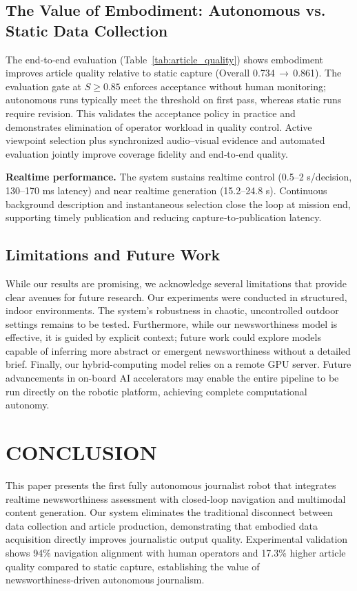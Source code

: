 \documentclass[letterpaper, 10 pt, conference]{ieeeconf}  %
\begin{document}
\subsection{The Value of Embodiment: Autonomous vs. Static Data Collection}

The end‑to‑end evaluation (Table~\ref{tab:article_quality}) shows embodiment improves article quality relative to static capture (Overall 0.734\,$\to$\,0.861). The evaluation gate at $S\!\ge\!0.85$ enforces acceptance without human monitoring; autonomous runs typically meet the threshold on first pass, whereas static runs require revision. This validates the acceptance policy in practice and demonstrates elimination of operator workload in quality control. Active viewpoint selection plus synchronized audio–visual evidence and automated evaluation jointly improve coverage fidelity and end‑to‑end quality.

\textbf{Real\-time performance.} The system sustains real\-time control (0.5–2 s/decision, 130–170 ms latency) and near real\-time generation (15.2–24.8 s). Continuous background description and instantaneous selection close the loop at mission end, supporting timely publication and reducing capture‑to‑publication latency.

\subsection{Limitations and Future Work}

While our results are promising, we acknowledge several limitations that provide clear avenues for future research. Our experiments were conducted in structured, indoor environments. The system's robustness in chaotic, uncontrolled outdoor settings remains to be tested. Furthermore, while our newsworthi\-ness model is effective, it is guided by explicit context; future work could explore models capable of inferring more abstract or emergent newsworthi\-ness without a detailed brief. Finally, our hybrid-computing model relies on a remote GPU server. Future advancements in on-board AI accelerators may enable the entire pipeline to be run directly on the robotic platform, achieving complete computational autonomy. 

\section{CONCLUSION}

This paper presents the first fully au\-ton\-omous journalist robot that integrates real\-time newsworthi\-ness assessment with closed-loop navigation and multi\-modal content generation. Our system eliminates the traditional disconnect between data collection and article production, demonstrating that embodied data acquisition directly improves journalistic output quality. Experimental validation shows 94\% navigation alignment with human operators and 17.3\% higher article quality compared to static capture, establishing the value of newsworthiness‑driven autonomous journalism.
\end{document}
